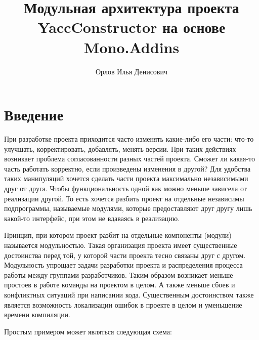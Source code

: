 \title{Модульная архитектура проекта YaccConstructor на основе Mono.Addins}
%

\author{Орлов Илья Денисович}
%
%
%

\maketitle

\begin{abstract}
\end{abstract}

\section*{Введение}
При разработке проекта приходится часто изменять какие-либо его части: что-то улучшать, корректировать, добавлять, менять версии. При таких действиях возникает проблема согласованности разных частей проекта. Сможет ли какая-то часть работать корректно, если произведены изменения в другой? Для удобства таких манипуляций хочется сделать части проекта максимально независимыми друг от друга. Чтобы функциональность одной как можно меньше зависела от реализации другой. То есть хочется разбить проект на отдельные независимы подпрограммы, называемые модулями, которые предоставляют друг другу лишь какой-то интерфейс, при этом не вдаваясь в реализацию.

Принцип, при котором проект разбит на отдельные компоненты (модули) называется модульностью. Такая организация проекта имеет существенные достоинства перед той, у которой части проекта тесно связаны друг с другом. Модульность упрощает задачи разработки проекта и распределения процесса работы между группами разработчиков. Таким образом возникает меньше простоев в работе команды на проектом в целом. А также меньше сбоев и конфликтных ситуаций при написании кода. Существенным достоинством также является возможность локализации ошибок в проекте в целом и уменьшение времени компиляции.

Простым примером может являться следующая схема:

